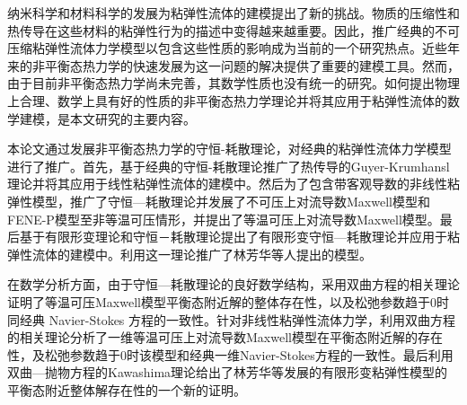 
\begin{cabstract}
纳米科学和材料科学的发展为粘弹性流体的建模提出了新的挑战。物质的压缩性和热传导在这些材料的粘弹性行为的描述中变得越来越重要。因此，推广经典的不可压缩粘弹性流体力学模型以包含这些性质的影响成为当前的一个研究热点。近些年来的非平衡态热力学的快速发展为这一问题的解决提供了重要的建模工具。然而，由于目前非平衡态热力学尚未完善，其数学性质也没有统一的研究。如何提出物理上合理、数学上具有好的性质的非平衡态热力学理论并将其应用于粘弹性流体的数学建模，是本文研究的主要内容。

本论文通过发展非平衡态热力学的守恒-耗散理论，对经典的粘弹性流体力学模型进行了推广。首先，基于经典的守恒-耗散理论推广了热传导的Guyer-Krumhansl理论并将其应用于线性粘弹性流体的建模中。然后为了包含带客观导数的非线性粘弹性模型，推广了守恒—耗散理论并发展了不可压上对流导数Maxwell模型和FENE-P模型至非等温可压情形，并提出了等温可压上对流导数Maxwell模型。最后基于有限形变理论和守恒－耗散理论提出了有限形变守恒—耗散理论并应用于粘弹性流体的建模中。利用这一理论推广了林芳华等人提出的模型。

在数学分析方面，由于守恒—耗散理论的良好数学结构，采用双曲方程的相关理论证明了等温可压Maxwell模型平衡态附近解的整体存在性，以及松弛参数趋于$0$时同经典 Navier-Stokes 方程的一致性。针对非线性粘弹性流体力学，利用双曲方程的相关理论分析了一维等温可压上对流导数Maxwell模型在平衡态附近解的存在性，及松弛参数趋于$0$时该模型和经典一维Navier-Stokes方程的一致性。最后利用双曲—抛物方程的Kawashima理论给出了林芳华等发展的有限形变粘弹性模型的平衡态附近整体解存在性的一个新的证明。

\end{cabstract}

